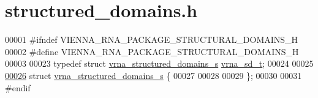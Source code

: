 \hypertarget{structured__domains_8h_source}{}\section{structured\+\_\+domains.\+h}
\label{structured__domains_8h_source}

\begin{DoxyCode}
00001 \textcolor{preprocessor}{#ifndef VIENNA\_RNA\_PACKAGE\_STRUCTURAL\_DOMAINS\_H}
00002 \textcolor{preprocessor}{#define VIENNA\_RNA\_PACKAGE\_STRUCTURAL\_DOMAINS\_H}
00003 
00023 \textcolor{keyword}{typedef} \textcolor{keyword}{struct }\hyperlink{structvrna__structured__domains__s}{vrna\_structured\_domains\_s}  \hyperlink{structvrna__structured__domains__s}{vrna\_sd\_t};
00024 
00025 
\hypertarget{structured__domains_8h_source.tex_l00026}{}\hyperlink{structvrna__structured__domains__s}{00026} \textcolor{keyword}{struct }\hyperlink{structvrna__structured__domains__s}{vrna\_structured\_domains\_s} \{
00027 
00028 
00029 \};
00030 
00031 \textcolor{preprocessor}{#endif}
\end{DoxyCode}

